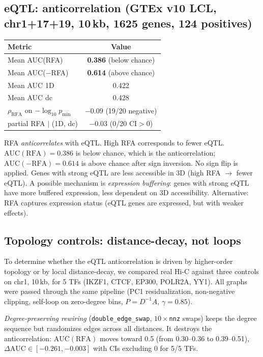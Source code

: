 \documentclass[11pt,a4paper]{article}
\begin{document}
\subsection{eQTL: anticorrelation (GTEx v10 LCL, chr1+17+19, 10\,kb, 1625 genes, 124 positives)}\label{sec:eqtl}
\begin{table}[h]
\centering
\begin{tabular}{lc}
\toprule
Metric & Value \\
\midrule
Mean AUC(RFA) & \textbf{0.386} (below chance) \\
Mean AUC($-$RFA) & \textbf{0.614} (above chance) \\
Mean AUC 1D & 0.422 \\
Mean AUC dc & 0.428 \\
$\rho_{\mathrm{RFA}}$ on $-\log_{10} p_{\min}$ & $\mathbf{-0.09}$ (19/20 negative) \\
partial RFA $\mid$ (1D, dc) & $-0.03$ (0/20 CI$>0$) \\
\bottomrule
\end{tabular}
\end{table}

RFA \emph{anticorrelates} with eQTL. High RFA corresponds to fewer eQTL. $\mathrm{AUC}(\mathrm{RFA})=0.386$ is below chance, which is the anticorrelation; $\mathrm{AUC}(-\mathrm{RFA})=0.614$ is above chance after sign inversion. No sign flip is applied. Genes with strong eQTL are less accessible in 3D (high RFA $\rightarrow$ fewer eQTL). A possible mechanism is \emph{expression buffering}: genes with strong eQTL have more buffered expression, less dependent on 3D accessibility. Alternative: RFA captures expression status (eQTL genes are expressed, but with weaker effects).

\subsection{Topology controls: distance-decay, not loops}\label{sec:topology_controls}
To determine whether the eQTL anticorrelation is driven by higher-order topology or by local distance-decay, we compared real Hi-C against three controls on chr1, 10\,kb, for 5 TFs (IKZF1, CTCF, EP300, POLR2A, YY1). All graphs were passed through the same pipeline (PC1 residualization, non-negative clipping, self-loop on zero-degree bins, $P=D^{-1}A$, $\gamma=0.85$).

\emph{Degree-preserving rewiring} (\texttt{double\_edge\_swap}, $10\times$\texttt{nnz} swaps) keeps the degree sequence but randomizes edges across all distances. It destroys the anticorrelation: $\mathrm{AUC}(\mathrm{RFA})$ moves toward 0.5 (from 0.30--0.36 to 0.39--0.51), $\Delta\mathrm{AUC} \in [-0.261, -0.003]$ with CIs excluding 0 for 5/5 TFs.
\end{document}
